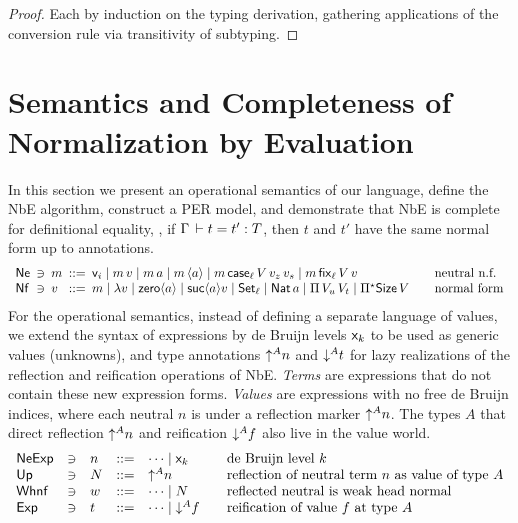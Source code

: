 \documentclass[acmsmall,screen]{acmart}\settopmatter{}
\begin{document}
\begin{proof}
  Each by induction on the typing derivation, gathering applications of the conversion rule via transitivity of subtyping.
\end{proof}



\section{Semantics and Completeness of Normalization by Evaluation}
\label{sec:sem}

In this section we present an operational semantics of our language,
define the NbE algorithm, construct a PER model, and demonstrate that
NbE is complete for definitional equality, \ie, if
$\Gamma \,\vdash t = t' : T$, then $t$ and $t'$ have the same normal form
up to annotations.
\[
\begin{array}{l@{~\,}l@{~\,}l@{~\,}l@{~\,}l@{\qquad}l}
  \Ne & \ni &
  m & ::= & \ind i \mid m\,v \mid m\,a \mid m\,\ann a \mid
            m\,\case[\ell] V{v_z}{v_s} \mid m\,\fix[\ell] V v
    & \mbox{neutral n.f.} \\
  \Nf & \ni &
  v & ::= & m \mid \lambda v \mid \zero a \mid \suc a v \mid
            \Set[\ell] \mid \Nat a \mid \piT {V_u}{V_t} \mid
            \epiT\Size V
    & \mbox{normal form} \\
\end{array}
\]
For the operational semantics,
instead of defining a separate language of values,
we extend the syntax of expressions by de Bruijn levels $\mathsf{x}_{k}$
to be used as generic values (unknowns), and type annotations
$\mathord{\uparrow^{A}} n$ and $\mathord{\downarrow^{A}} t$ for lazy realizations of the
reflection and reification operations of NbE.
\emph{Terms} are expressions that do not contain these new expression
forms. \emph{Values}  are expressions with no free de Bruijn
indices, where each neutral $n$ is under a reflection marker $\mathord{\uparrow^{A}} n$.
The types $A$ that direct reflection $\mathord{\uparrow^{A}} n$ and reification
$\mathord{\downarrow^{A}} f$ also live in the value world.
\[
\begin{array}{lllrl@{\qquad}l}
  \NeExp & \ni & n & ::= & \dots \mid \lev k
    & \mbox{de Bruijn level $k$} \\
  \tUp  & \ni & N & ::= & \up A n
     & \mbox{reflection of neutral term $n$ as value of type $A$} \\
  \Whnf & \ni & w & ::= & \dots \mid N
    & \mbox{reflected neutral is weak head normal} \\
  \Exp  & \ni & t & ::= & \dots \mid \down A f
     & \mbox{reification of value $f$ at type $A$} \\
\end{array}
\]
\end{document}
